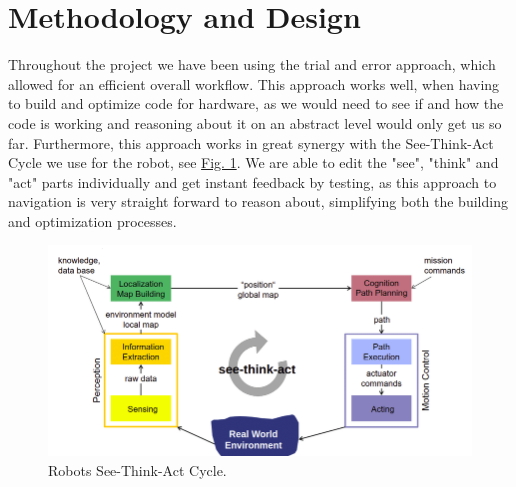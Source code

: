 \documentclass[conference]{IEEEtran}
\begin{document}
\section{Methodology and Design}
Throughout the project we have been using the trial and error approach, which allowed for an efficient overall workflow. 
This approach works well, when having to build and optimize code for hardware, as we would need to see if and how the code is working and reasoning about it on an abstract level would only get us so far.
Furthermore, this approach works in great synergy with the See-Think-Act Cycle we use for the robot, see \href{sec:STAC}{Fig. 1}.
We are able to edit the "see", "think" and "act" parts individually and get instant feedback by testing, as this approach to navigation is very straight forward to reason about, simplifying both the building and optimization processes.
\begin{figure}[htbp]
    \centerline{\includegraphics[width=1.0\columnwidth]{Pictures/STAC.png}}
    \caption{Robots See-Think-Act Cycle.}
    \label{sec:STAC}
    \end{figure}
\end{document}
